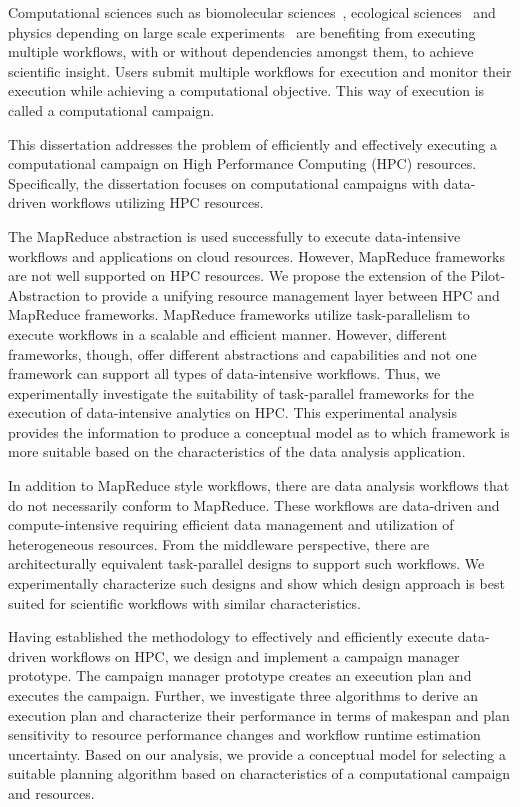 Computational sciences such as biomolecular 
sciences~\cite{cheatham2015impact, dakka2018concurrent}, ecological 
sciences~\cite{goncalves2020sealnet, paraskevakos2019workflow} and physics 
depending on large scale experiments~\cite{atlas} are benefiting from 
executing multiple workflows, with or without dependencies amongst them, to 
achieve scientific insight. Users submit multiple workflows for execution and
monitor their execution while achieving a computational objective. This way
of execution is called a computational campaign.

This dissertation addresses the problem of efficiently and effectively 
executing a computational campaign on High Performance Computing
(HPC) resources. Specifically, the dissertation focuses on computational 
campaigns with data-driven workflows utilizing HPC resources.

The MapReduce abstraction is used successfully to execute data-intensive 
workflows and applications on cloud resources. However, MapReduce frameworks 
are not well supported on HPC resources. We propose the extension of the 
Pilot-Abstraction to provide a unifying resource management layer between HPC 
and MapReduce frameworks. MapReduce frameworks utilize task-parallelism to 
execute workflows in a scalable and efficient manner. However, different 
frameworks, though, offer different abstractions and capabilities and not one 
framework can support all types of data-intensive workflows. Thus, we 
experimentally investigate the suitability of task-parallel frameworks for the 
execution of data-intensive analytics on HPC. This experimental analysis 
provides the information to produce a conceptual model as to which framework is 
more suitable based on the characteristics of the data analysis application.

In addition to MapReduce style workflows, there are data analysis workflows 
that do not necessarily conform to MapReduce. These workflows are data-driven 
and compute-intensive requiring efficient data management and utilization of 
heterogeneous resources. From the middleware perspective, there are 
architecturally equivalent task-parallel designs to support such workflows. We 
experimentally characterize such designs and show which design approach is best 
suited for scientific workflows with similar characteristics.

Having established the methodology to effectively and efficiently execute
data-driven workflows on HPC, we design and implement a campaign manager
prototype. The campaign manager prototype creates an execution plan and
executes the campaign. Further, we investigate three algorithms to derive an
execution plan and characterize their performance in terms of makespan and
plan sensitivity to resource performance changes and workflow runtime
estimation uncertainty. Based on our analysis, we provide a conceptual model
for selecting a suitable planning algorithm based on characteristics of a
computational campaign and resources.

